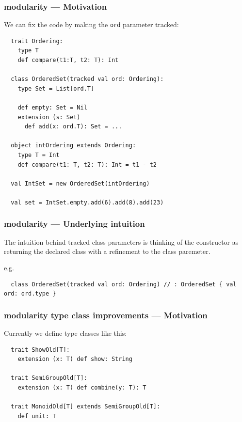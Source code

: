 \documentclass{beamer}
\begin{document}
\begin{frame}[fragile]
  \frametitle{modularity --- Motivation}

  We can fix the code by making the \texttt{ord} parameter tracked:

  \begin{lstlisting}
  trait Ordering:
    type T
    def compare(t1:T, t2: T): Int
  
  class OrderedSet(tracked val ord: Ordering):
    type Set = List[ord.T]
  
    def empty: Set = Nil
    extension (s: Set)
      def add(x: ord.T): Set = ...

  object intOrdering extends Ordering:
    type T = Int
    def compare(t1: T, t2: T): Int = t1 - t2
  
  val IntSet = new OrderedSet(intOrdering)

  val set = IntSet.empty.add(6).add(8).add(23)
  \end{lstlisting}

\end{frame}

\begin{frame}[fragile]
  \frametitle{modularity --- Underlying intuition}

  The intuition behind tracked class parameters is thinking of the constructor as returning the declared class with a refinement to the class paremeter.

  e.g.

  \begin{lstlisting}
  class OrderedSet(tracked val ord: Ordering) // : OrderedSet { val ord: ord.type }
  \end{lstlisting}

\end{frame}

\begin{frame}[fragile]
  \frametitle{modularity type class improvements --- Motivation}

  Currently we define type classes like this:

  \begin{lstlisting}
  trait ShowOld[T]:
    extension (x: T) def show: String
  
  trait SemiGroupOld[T]:
    extension (x: T) def combine(y: T): T
  
  trait MonoidOld[T] extends SemiGroupOld[T]:
    def unit: T
  \end{lstlisting}

\end{frame}
\end{document}
